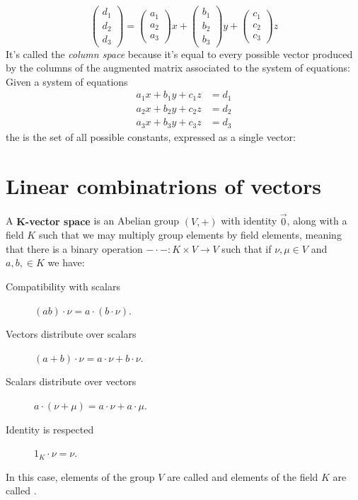 \documentclass{ximera}
\begin{document}
\[
\begin{pmatrix} d_1 \\ d_2 \\ d_3 \end{pmatrix}=\begin{pmatrix} a_1 \\ a_2 \\ a_3 \end{pmatrix} x +
\begin{pmatrix} b_1 \\ b_2 \\ b_3 \end{pmatrix} y +
\begin{pmatrix} c_1 \\ c_2 \\ c_3 \end{pmatrix} z
\]
It's called the \textit{column space} because it's equal to every
possible vector produced by the columns of the augmented matrix
associated to the system of equations:
Given a system of equations
\begin{align*}
  a_1 x + b_1 y + c_1 z &= d_1\\
  a_2 x + b_2 y + c_2 z &= d_2\\
  a_3 x + b_3 y + c_3 z &= d_3
\end{align*}
the  is the set of all possible constants, expressed
as a single vector:





\section{Linear combinatrions of vectors}

\begin{definition}
  A \textbf{$\boldsymbol{K}$-vector space} is an Abelian group $(V,+)$
  with identity $\vec{0}$, along with a field $K$ such that we may
  multiply group elements by field elements, meaning that there is a
  binary operation $-\cdot-: K\times V \to V$ such that if $\nu,\mu\in
  V$ and $a,b,\in K$ we have:
\begin{description}
\item[Compatibility with scalars] $(ab)\cdot \nu = a\cdot (b\cdot \nu)$.
\item[Vectors distribute over scalars] $(a+b)\cdot \nu =
  a\cdot\nu + b\cdot \nu$.
\item[Scalars distribute over vectors] $a\cdot (\nu+\mu) =
  a\cdot \nu + a\cdot \mu$.
\item[Identity is respected] $1_K\cdot \nu = \nu$.
\end{description}
In this case, elements of the group $V$ are called  and
elements of the field $K$ are called .
\end{definition}
\end{document}
